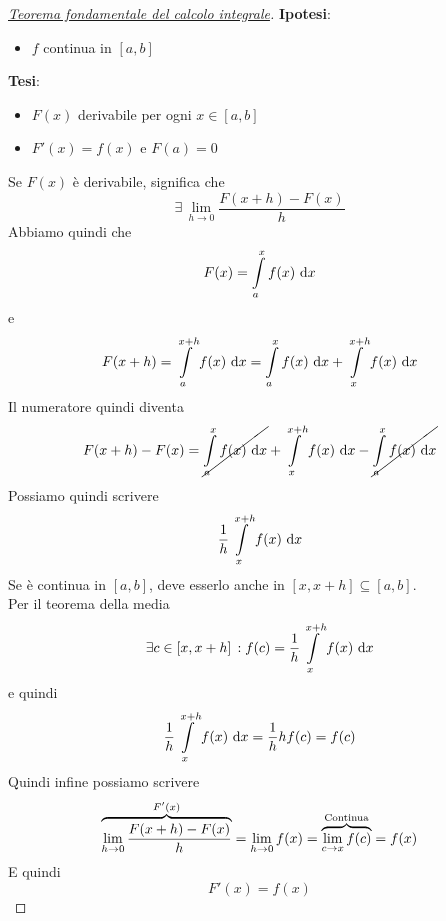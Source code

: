 \begin{proof}
  [\protect\hyperlink{teor:tfci}{Teorema fondamentale del calcolo integrale}]
  \textbf{Ipotesi}:
  \begin{itemize}
    \item $f$ continua in $[a,b]$
  \end{itemize}
  \textbf{Tesi}:
  \begin{itemize}
    \item $F(x)$ derivabile per ogni $x\in[a,b]$
    \item $F'(x)=f(x)$ e $F(a)=0$
  \end{itemize}
  \divisor

  Se $F(x)$ è derivabile, significa che
  \begin{equation*}
    \exists\,\lim\limits_{h\to0} \frac{F(x+h)-F(x)}{h}
  \end{equation*}
  Abbiamo quindi che
  \begin{equation*}
    F(x) = \int\limits_{a}^{x} f(x)\,\mathop{}\!\mathrm{d} x
  \end{equation*}
  e
  \begin{equation*}
    F(x+h) = \int\limits_{a}^{x+h} f(x)\,\mathop{}\!\mathrm{d} x = \int\limits_{a}^{x} f(x)\,\mathop{}\!\mathrm{d} x + 
    \int\limits_{x}^{x+h} f(x)\,\mathop{}\!\mathrm{d} x
  \end{equation*}
  Il numeratore quindi diventa
  \begin{equation*}
    F(x+h)-F(x) = \cancel{\int\limits_{a}^{x} f(x)\,\mathop{}\!\mathrm{d} x}+\int\limits_{x}^{x+h} f(x)\,\mathop{}\!\mathrm{d} x
    -\cancel{\int\limits_{a}^{x} f(x)\,\mathop{}\!\mathrm{d} x}
  \end{equation*}
  Possiamo quindi scrivere
  \begin{equation*}
    \frac{1}{h}\int\limits_{x}^{x+h} f(x)\,\mathop{}\!\mathrm{d} x
  \end{equation*}
  Se è continua in $[a,b]$, deve esserlo anche in $[x,x+h]\subseteq[a,b]$.\\
  Per il teorema della media
  \begin{equation*}
    \exists c\in[x,x+h]\,: f(c)=\frac{1}{h}\int\limits_{x}^{x+h} f(x)\,\mathop{}\!\mathrm{d} x
  \end{equation*}
  e quindi
  \begin{equation*}
    \frac{1}{h}\int\limits_{x}^{x+h} f(x)\,\mathop{}\!\mathrm{d} x=\frac{1}{h}h f(c) = f(c)
  \end{equation*}
  Quindi infine possiamo scrivere
  \begin{equation*}
    \overbrace{\lim\limits_{h\to0} \frac{F(x+h)-F(x)}{h}}^{\mathclap{F'(x)}}=
    \lim\limits_{h\to0}f(x)=\overbrace{\lim\limits_{c\to x}f(c)}^{\mathclap{\text{Continua}}}=f(x)
  \end{equation*}
  E quindi
  \begin{equation*}
    F'(x) = f(x)
  \end{equation*}
\end{proof}


